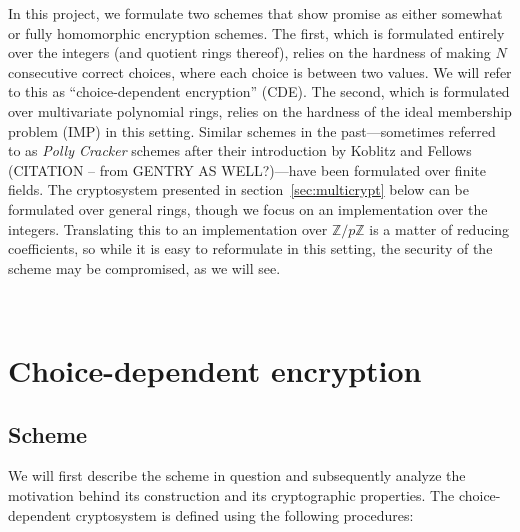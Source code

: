 \documentclass[11pt]{report}
\newcommand{\Z}{\mathbb{Z}}
\begin{document}
In this project, we formulate two schemes that show promise as either somewhat or fully homomorphic encryption schemes. The first,
which is formulated entirely over the integers (and quotient rings thereof), relies on the hardness of making $N$ consecutive correct choices, where each choice
is between two values. We will refer to this as ``choice-dependent encryption'' (CDE). The second, which is formulated over multivariate polynomial rings, relies on the hardness of the ideal membership problem (IMP) in this
setting. Similar schemes in the past---sometimes referred to as \emph{Polly Cracker} schemes after their introduction by Koblitz and Fellows (CITATION -- from GENTRY AS WELL?)---have been formulated over finite fields. The cryptosystem presented in section~\ref{sec:multicrypt}  below can be formulated over general rings, though we focus on an implementation over the integers. Translating this to an implementation over $\Z/p\Z$ is a matter of reducing coefficients, so while it is easy to reformulate in this setting, the security of the scheme may be compromised, as we will see.

\

\section{Choice-dependent encryption}

\subsection{Scheme}

We will first describe the scheme in question and subsequently analyze the motivation behind its construction and its cryptographic properties. The choice-dependent cryptosystem is defined using the following procedures:
\end{document}
